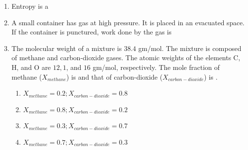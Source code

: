 \documentclass[a4paper,10pt]{article}
\begin{document}
\begin{enumerate}
    \item Entropy is a
    
    \hfill{}
    \begin{enumerate}[label=\Alph*)]
    \end{enumerate}

    \item A small container has gas at high pressure. It is placed in an evacuated space. If the container is punctured, work done by the gas is
    
    \hfill{}
    \begin{enumerate}[label=\Alph*)]
    \end{enumerate}

    \item The molecular weight of a mixture is $38.4$ gm/mol. The mixture is composed of methane and carbon-dioxide gases. The atomic weights of the elements C, H, and O are $12, 1$, and $16$ gm/mol, respectively. The mole fraction of methane ($X_{methane}$) is \underline{\hspace{2cm}} and that of carbon-dioxide ($X_{carbon-dioxide}$) is \underline{\hspace{2cm}}.
    
    \hfill{}
    \begin{enumerate}[label=\Alph*)]
        \item $X_{methane} = 0.2; X_{carbon-dioxide} = 0.8$
        \item $X_{methane} = 0.8; X_{carbon-dioxide} = 0.2$
        \item $X_{methane} = 0.3; X_{carbon-dioxide} = 0.7$
        \item $X_{methane} = 0.7; X_{carbon-dioxide} = 0.3$
    \end{enumerate}


\end{enumerate}
\end{document}
